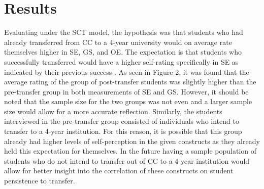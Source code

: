 \documentclass{article}
\begin{document}

 \section{Results}
Evaluating under the SCT model, the hypothesis was that students who had already transferred from CC to a 4-year university would on average rate themselves higher in SE, GS, and OE. The expectation is that students who successfully transferred would have a higher self-rating specifically in SE as indicated by their previous success \cite{chen2014influence, dutta2015social, jung2017self, luo2021stem,pajares1996self}.
As seen in Figure 2, %
it was found that the average rating of the group of post-transfer students was slightly higher than the pre-transfer group in both measurements of SE and GS. However, it should be noted that the sample size for the two groups was not even and a larger sample size would allow for a more accurate reflection. Similarly, the students interviewed in the pre-transfer group consisted of individuals who intend to transfer to a 4-year institution. For this reason, it is possible that this group already had higher levels of self-perception in the given constructs as they already held this expectation for themselves. In the future having a sample population of students who do not intend to transfer out of CC to a 4-year institution would allow for better insight into the correlation of these constructs on student persistence to transfer. 
\end{document}
